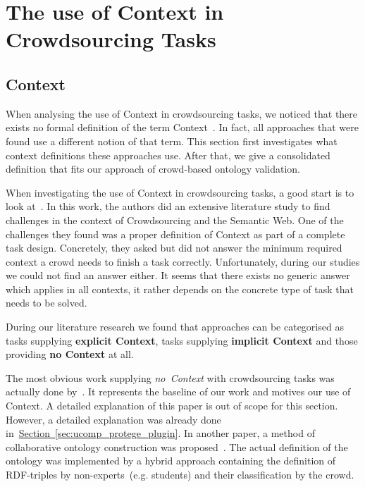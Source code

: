 \section{The use of Context in Crowdsourcing Tasks}\label{sec:the_use_of_context_in_crowdsourcing}
% 

\subsection{Context}\label{sec:context_in_crowdsourcing_tasks_context}
When analysing the use of Context in crowdsourcing tasks, we noticed that there exists no formal definition of the term \guillemotright Context\guillemotleft~. In fact, all approaches that were found use a different notion of that term. 
This section first investigates what context definitions these approaches use. After that, we give a consolidated definition that fits our approach of crowd-based ontology validation.

When investigating the use of Context in crowdsourcing tasks, a good start is to look at~\cite{sarasua2015crowdsourcing}. In this work, the authors did an extensive literature study to find challenges in the context of Crowdsourcing and the Semantic Web. One of the challenges they found was a proper definition of Context as part of a complete task design. Concretely, they asked but did not answer the minimum required context a crowd needs to finish a task correctly. Unfortunately, during our studies we could not find an answer either. It seems that there exists no generic answer which applies in all contexts, it rather depends on the concrete type of task that needs to be solved. 

During our literature research we found that approaches can be categorised as tasks supplying \textbf{explicit Context}, tasks supplying \textbf{implicit Context} and those providing \textbf{no Context} at all. 

The most obvious work supplying \emph{no~Context} with crowdsourcing tasks was actually done by~\cite{wohlgenannt2016}. It represents the baseline of our work and motives our use of Context. A detailed explanation of this paper is out of scope for this section. However, a detailed explanation was already done in~\hyperref[sec:ucomp_protege_plugin]{Section~\ref*{sec:ucomp_protege_plugin}}. In another paper, a method of collaborative ontology construction was proposed~\cite{zhitomirsky2017}. The actual definition of the ontology was implemented by a hybrid approach containing the definition of RDF-triples by non-experts~(e.g. students) and their classification by the crowd.

